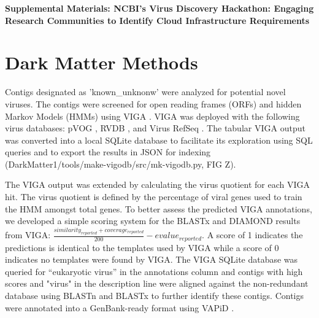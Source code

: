 \pagebreak
\textbf{\large Supplemental Materials: NCBI's Virus Discovery Hackathon: Engaging Research Communities to Identify Cloud Infrastructure Requirements}
\setcounter{equation}{0}
\setcounter{figure}{0}
\setcounter{table}{0}
\setcounter{section}{0}
\renewcommand{\theequation}{S\arabic{equation}}
\renewcommand{\thefigure}{S\arabic{figure}}
\renewcommand{\bibnumfmt}[1]{[S#1]}
\renewcommand{\citenumfont}[1]{S#1
\renewcommand{\thefigure}{S\arabic{figure}}}
\renewcommand{\thepart}{\arabic{part}}
\renewcommand\thesection{Supplementary Material~\arabic{section}}
\renewcommand\thesubsection{\alph{subsection})}
\renewcommand\thesubsubsection{\roman{subsection})}

\section{Dark Matter Methods}
  \label{sec:sm_dm}
  Contigs designated as 'known\_unknonw' were analyzed for potential novel
  viruses. The contigs were screened for open reading frames (ORFs) and hidden
  Markov Models (HMMs) using VIGA \cite{Gonzalez-Tortuero2018}. VIGA was
  deployed with the following virus databases: pVOG \cite{Grazziotin2017}, RVDB
  \cite{Goodacre2018}, and Virus RefSeq \cite{Brister2015}. The tabular VIGA
  output was converted into a local SQLite database to facilitate its
  exploration using SQL queries and to export the results in JSON
  \cite{rfc_json} for indexing (DarkMatter1/tools/make-vigodb/src/mk-vigodb.py,
  FIG Z).

  The VIGA output was extended by calculating the virus quotient for each VIGA
  hit. The virus quotient is defined by the percentage of viral genes used to
  train the HMM amongst total genes. To better assess the predicted  VIGA
  annotations, we developed a simple scoring system for the BLASTx and DIAMOND
  results from VIGA:
  $\frac{similarity_{reported} + coverage_{reported}}{200} - evalue_{reported}$.
  A score of 1 indicates the predictions is identical to the templates used  by
  VIGA while a score of 0 indicates no templates  were found by VIGA. The VIGA
  SQLite database was queried for “eukaryotic virus” in the annotations column
  and contigs with high scores and "virus" in the description line were aligned
  against the non-redundant database using BLASTn and BLASTx \cite{Camacho2009}
  to further identify  these contigs. Contigs were annotated into a
  GenBank-ready format using VAPiD \cite{Shean2019}.

